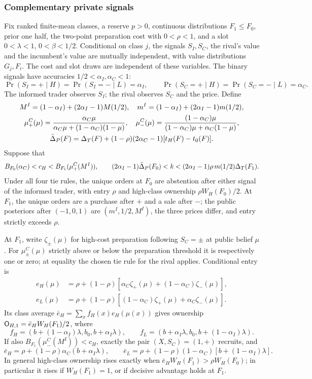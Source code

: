 \subsubsection*{Complementary private signals}

\begin{proposition}\label{prop:signals}
Fix ranked finite-mean classes, a reserve \(p>0\), continuous distributions \(F_1\le F_0\), prior one half, the
two-point preparation cost with \(0<\rho<1\), and a slot \(0<\lambda<1\), \(0<\beta<1/2\). Conditional on class
\(j\), the signals \(S_I,S_C\), the rival's value and the incumbent's value are mutually independent, with
value distributions \(G_j,F_i\). The cost and slot draws are independent of these variables. The binary signals have
accuracies \(1/2<\alpha_I,\alpha_C<1\):
\[
\Pr(S_I=+\mid H)=\Pr(S_I=-\mid L)=\alpha_I,\qquad
\Pr(S_C=+\mid H)=\Pr(S_C=-\mid L)=\alpha_C.
\]
The informed trader observes \(S_I\); the rival observes \(S_C\) and the price. Define
\[
\begin{gathered}
M^I=(1-\alpha_I)+(2\alpha_I-1)M(1/2),\quad
m^I=(1-\alpha_I)+(2\alpha_I-1)m(1/2),\\
\mu^C_+(\mu)=\frac{\alpha_C\mu}{\alpha_C\mu+(1-\alpha_C)(1-\mu)},\quad
\mu^C_-(\mu)=\frac{(1-\alpha_C)\mu}{(1-\alpha_C)\mu+\alpha_C(1-\mu)},\\
\bar\Delta_P(F)=\Delta_T(F)+(1-\rho)(2\alpha_C-1)[t_H(F)-t_0(F)].
\end{gathered}
\]
Suppose that
\[
B_{F_0}(\alpha_C)<c_H<B_{F_1}(\mu^C_+(M^I)),\qquad
(2\alpha_I-1)\bar\Delta_P(F_0)<k<(2\alpha_I-1)\rho\,m(1/2)\Delta_T(F_1).
\]
Under all four tie rules, the unique orders at \(F_0\) are abstention after either signal of the informed trader, with entry
\(\rho\) and high-class ownership \(\rho W_H(F_0)/2\). At \(F_1\), the unique orders are a purchase after \(+\)
and a sale after \(-\); the public posteriors after \((-1,0,1)\) are \((m^I,1/2,M^I)\), the three prices differ,
and entry strictly exceeds \(\rho\).

At \(F_1\), write \(\zeta_\pm(\mu)\) for high-cost preparation following \(S_C=\pm\) at public belief \(\mu\).
For \(\mu^C_\pm(\mu)\) strictly above or below the preparation threshold it is respectively one or zero; at
equality the chosen tie rule for the rival applies. Conditional entry is
\[
\begin{aligned}
e_H(\mu)&=\rho+(1-\rho)[\alpha_C\zeta_+(\mu)+(1-\alpha_C)\zeta_-(\mu)],\\
e_L(\mu)&=\rho+(1-\rho)[(1-\alpha_C)\zeta_+(\mu)+\alpha_C\zeta_-(\mu)].
\end{aligned}
\]
Its class average \(\bar e_H=\sum_x f_H(x)e_H(\mu(x))\) gives ownership \(\mathsf{O}_{H,1}=\bar e_HW_H(F_1)/2\), where
\[
f_H=(b+(1-\alpha_I)\lambda,b_0,b+\alpha_I\lambda),\qquad
f_L=(b+\alpha_I\lambda,b_0,b+(1-\alpha_I)\lambda).
\]
If also \(B_{F_1}(\mu^C_-(M^I))<c_H\), exactly the pair \((X,S_C)=(1,+)\) recruits, and
\[
\bar e_H=\rho+(1-\rho)\alpha_C(b+\alpha_I\lambda),\qquad
\bar e_L=\rho+(1-\rho)(1-\alpha_C)[b+(1-\alpha_I)\lambda].
\]
In general high-class ownership rises exactly when \(\bar e_HW_H(F_1)>\rho W_H(F_0)\); in particular it rises if
\(W_H(F_1)=1\), or if decisive advantage holds at \(F_1\).
\end{proposition}

